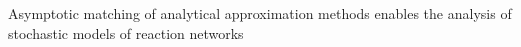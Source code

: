 Asymptotic matching of analytical approximation methods enables the analysis of stochastic models of reaction networks